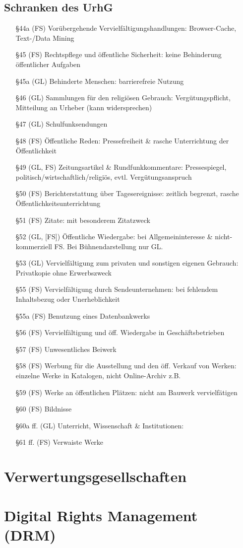 \documentclass{article}
\begin{document}
\subsection{Schranken des UrhG}
\begin{itemize}
  \item[§44a] (FS) Vorübergehende Vervielfältigungshandlungen: Browser-Cache, Text-/Data Mining
  \item[§45] (FS) Rechtspflege und öffentliche Sicherheit: keine Behinderung öffentlicher Aufgaben
  \item[§45a] (GL) Behinderte Menschen: barrierefreie Nutzung
  \item[§46] (GL)  Sammlungen für den religiösen Gebrauch: Vergütungspflicht, Mitteilung an Urheber (kann widersprechen)
  \item[§47] (GL)  Schulfunksendungen
  \item[§48] (FS)  Öffentliche Reden: Pressefreiheit \& rasche Unterrichtung der Öffentlichkeit
  \item[§49] (GL, FS) Zeitungsartikel \& Rundfunkkommentare: Pressespiegel, politisch/wirtschaftlich/religiös, evtl. Vergütungsanspruch
  \item[§50] (FS) Berichterstattung über Tagesereignisse: zeitlich begrenzt, rasche Öffentlichkeitsunterrichtung
  \item[§51] (FS) Zitate: mit besonderem Zitatzweck
  \item[§52] (GL, [FS]) Öffentliche Wiedergabe: bei Allgemeininteresse \& nicht-kommerziell FS. Bei Bühnendarstellung nur GL.
  \item[§53] (GL) Vervielfältigung zum privaten und sonstigen eigenen Gebrauch: Privatkopie ohne Erwerbszweck
  \item[§55] (FS) Vervielfältigung durch Sendeunternehmen: bei fehlendem Inhaltsbezug oder Unerheblichkeit
  \item[§55a] (FS) Benutzung eines Datenbankwerks
  \item[§56] (FS) Vervielfältigung und öff. Wiedergabe in Geschäftsbetrieben
  \item[§57] (FS) Unwesentliches Beiwerk
  \item[§58] (FS) Werbung für die Ausstellung und den öff. Verkauf von Werken: einzelne Werke in Katalogen, nicht Online-Archiv z.B.
  \item[§59] (FS) Werke an öffentlichen Plätzen: nicht am Bauwerk vervielfätigen
  \item[§60] (FS) Bildnisse
  \item[§60a ff.] (GL) Unterricht, Wissenschaft \& Institutionen:
  \item[§61 ff.] (FS) Verwaiste Werke
\end{itemize}



\section{Verwertungsgesellschaften}




\section{Digital Rights Management (DRM)}
\end{document}

